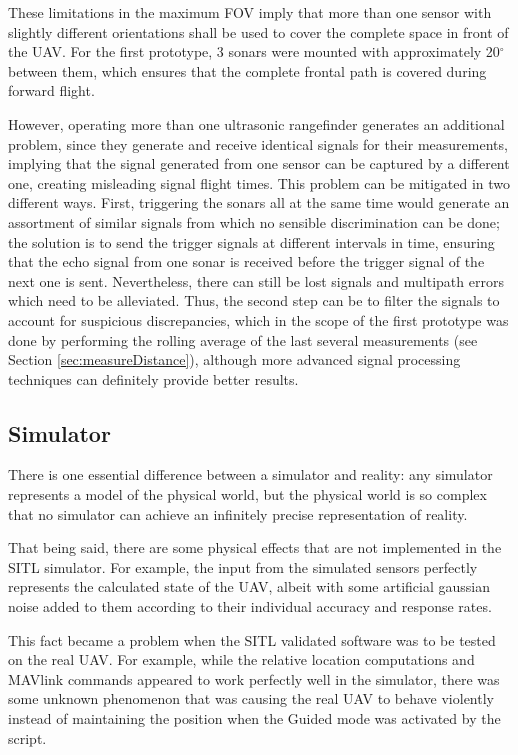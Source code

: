

These limitations in the maximum FOV imply that more than one sensor with slightly different orientations shall be used to cover the complete space in front of the UAV.
For the first prototype, 3 sonars were mounted with approximately 20$^\circ$ between them, which ensures that the complete frontal path is covered during forward flight.

However, operating more than one ultrasonic rangefinder generates an additional problem, since they generate and receive identical signals for their measurements, implying that the signal generated from one sensor can be captured by a different one, creating misleading signal flight times.
This problem can be mitigated in two different ways.
First, triggering the sonars all at the same time would generate an assortment of similar signals from which no sensible discrimination can be done; the solution is to send the trigger signals at different intervals in time, ensuring that the echo signal from one sonar is received before the trigger signal of the next one is sent.
Nevertheless, there can still be lost signals and multipath errors which need to be alleviated.
Thus, the second step can be to filter the signals to account for suspicious discrepancies, which in the scope of the first prototype was done by performing the rolling average of the last several measurements (see Section \ref{sec:measureDistance}), although more advanced signal processing techniques can definitely provide better results.


\subsection{Simulator}

There is one essential difference between a simulator and reality: any simulator represents a model of the physical world, but the physical world is so complex that no simulator can achieve an infinitely precise representation of reality.

That being said, there are some physical effects that are not implemented in the SITL simulator. For example, the input from the simulated sensors perfectly represents the calculated state of the UAV, albeit with some artificial gaussian noise added to them according to their individual accuracy and response rates.

This fact became a problem when the SITL validated software was to be tested on the real UAV.
For example, while the relative location computations and MAVlink commands appeared to work perfectly well in the simulator, there was some unknown phenomenon that was causing the real UAV to behave violently instead of maintaining the position when the Guided mode was activated by the script.

